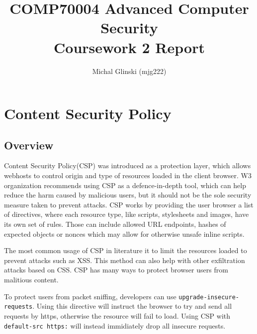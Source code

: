 \documentclass[11]{article}   %
\begin{document}
\title{COMP70004 Advanced Computer Security\\Coursework 2 Report} 
\author{Michal Glinski (mjg222)}    

\maketitle

\section{Content Security Policy}
\subsection{Overview}
Content Security Policy(CSP) was introduced as a protection layer, which allows webhosts to control origin and type of resources loaded in the client browser. 
W3 organization recommends using CSP as a defence-in-depth tool, which can help reduce the harm caused by malicious users, but it should not be the sole security measure taken to prevent attacks. \cite{CSPLevel3}
CSP works by providing the user browser a list of directives, where each resource type, like scripts, stylesheets and images, have its own set of rules.
Those can include allowed URL endpoints, hashes of expected objects or nonces which may allow for otherwise unsafe inline scripts.

The most common usage of CSP in literature it to limit the resources loaded to prevent attacks such as XSS.
This method can also help with other exfiltration attacks based on CSS.
CSP has many ways to protect browser users from malitious content.

To protect users from packet sniffing, developers can use \texttt{upgrade-insecure-requests}.
Using this directive will instruct the browser to try and send all requests by https, otherwise the resource will fail to load.
Using CSP with \texttt{default-src https:} will instead immidiately drop all insecure requests.
\end{document}
